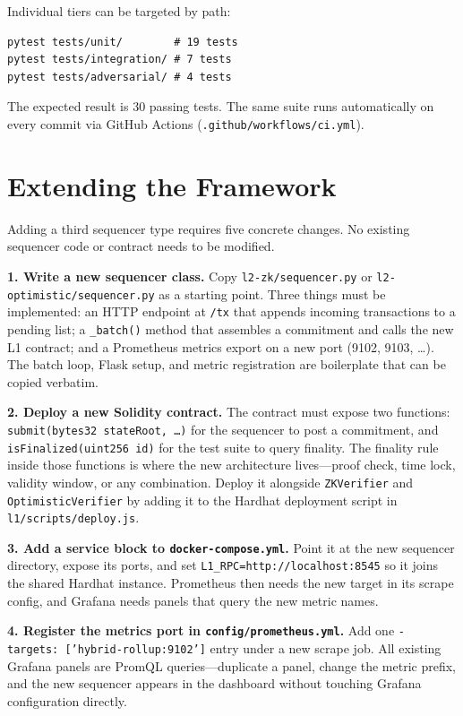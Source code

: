 Individual tiers can be targeted by path:

\begin{verbatim}
pytest tests/unit/        # 19 tests
pytest tests/integration/ # 7 tests
pytest tests/adversarial/ # 4 tests
\end{verbatim}

The expected result is 30 passing tests. The same suite runs automatically on every commit via GitHub Actions (\texttt{.github/workflows/ci.yml}).

\section{Extending the Framework}
\label{sec:extending}

Adding a third sequencer type requires five concrete changes. No existing sequencer code or contract needs to be modified.

\textbf{1. Write a new sequencer class.} Copy \texttt{l2-zk/sequencer.py} or \texttt{l2-optimistic/sequencer.py} as a starting point. Three things must be implemented: an HTTP endpoint at \texttt{/tx} that appends incoming transactions to a pending list; a \texttt{\_batch()} method that assembles a commitment and calls the new L1 contract; and a Prometheus metrics export on a new port (9102, 9103, \ldots). The batch loop, Flask setup, and metric registration are boilerplate that can be copied verbatim.

\textbf{2. Deploy a new Solidity contract.} The contract must expose two functions: \texttt{submit(bytes32 stateRoot, \ldots)} for the sequencer to post a commitment, and \texttt{isFinalized(uint256 id)} for the test suite to query finality. The finality rule inside those functions is where the new architecture lives---proof check, time lock, validity window, or any combination. Deploy it alongside \texttt{ZKVerifier} and \texttt{OptimisticVerifier} by adding it to the Hardhat deployment script in \texttt{l1/scripts/deploy.js}.

\textbf{3. Add a service block to \texttt{docker-compose.yml}.} Point it at the new sequencer directory, expose its ports, and set \texttt{L1\_RPC=http://localhost:8545} so it joins the shared Hardhat instance. Prometheus then needs the new target in its scrape config, and Grafana needs panels that query the new metric names.

\textbf{4. Register the metrics port in \texttt{config/prometheus.yml}.} Add one \texttt{- targets: ['hybrid-rollup:9102']} entry under a new scrape job. All existing Grafana panels are PromQL queries---duplicate a panel, change the metric prefix, and the new sequencer appears in the dashboard without touching Grafana configuration directly.

